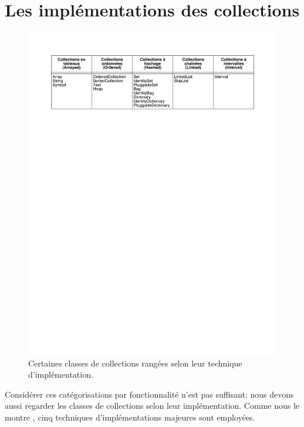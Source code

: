 \documentclass[a4paper,10pt,twoside]{book}
\begin{document}
\section{Les implémentations des collections}

\begin{figure}
\begin{center}
\includegraphics[width=\textwidth]{CollectionsByImpl}
\caption{Certaines classes de collections rangées selon leur technique d'implémentation.
    }
\end{center}
\end{figure}

Considérer ces catégorisations par fonctionnalité n'est pas 
suffisant; nous devons aussi regarder les classes de collections selon
leur implémentation. Comme nous le montre 
, cinq techniques d'implémentations majeures 
sont employées.
\end{document}
